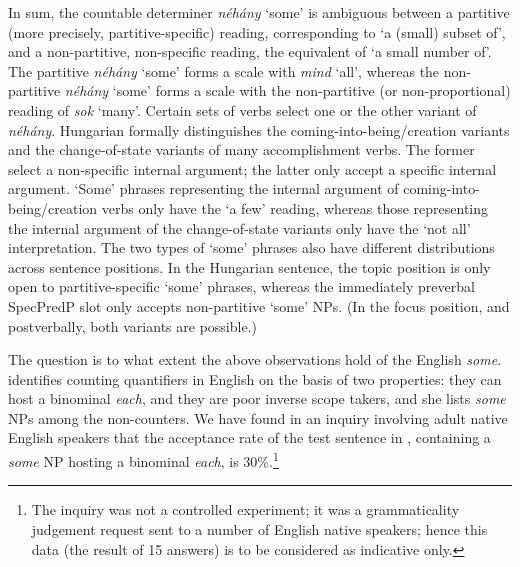\documentclass[output=paper]{langscibook}
\begin{document}
\eal
{}
\zl

\noindent In sum, the countable determiner \textit{néhány} `some' is ambiguous between a partitive (more precisely, partitive-specific) reading, corresponding to ‘a (small) subset of’, and a non-partitive, non-specific reading, the equivalent of `a small number of'. The partitive \textit{néhány} `some' forms a scale with \textit{mind} `all', whereas the non-partitive \textit{néhány} `some' forms a scale with the non-partitive (or non-pro\-por\-tion\-al) reading of \textit{sok} ‘many’. Certain sets of verbs select one or the other variant of \textit{néhány}. Hungarian formally distinguishes the coming-into-being/creation variants and the change-of-state variants of many accomplishment verbs. The former select a non-specific internal argument; the latter only accept a specific internal argument. `Some' phrases representing the internal argument of coming-into-being/creation verbs only have the ‘a few’ reading, whereas those representing the internal argument of the change-of-state variants only have the ‘not all’ interpretation. The two types of `some' phrases also have different distributions across sentence positions. In the Hungarian sentence, the topic position is only open to partitive-specific `some' phrases, whereas the immediately preverbal SpecPredP slot only accepts non-partitive `some' NPs. (In the focus position, and postverbally, both variants are possible.) 

The question is to what extent the above observations hold of the English \textit{some}. \citet[173]{szabolcsi2010quant} identifies counting quantifiers in English on the basis of two properties: they can host a binominal \textit{each}, and they are poor inverse scope takers, and she lists \textit{some} NPs among the non-counters. We have found in an inquiry involving adult native English speakers that the acceptance rate of the test sentence in , containing a \textit{some} NP hosting a binominal \textit{each}, is 30\%.\footnote{The inquiry was not a controlled experiment; it was a grammaticality judgement request sent to a number of English native speakers; hence this data (the result of 15 answers) is to be considered as indicative only.}
\end{document}
